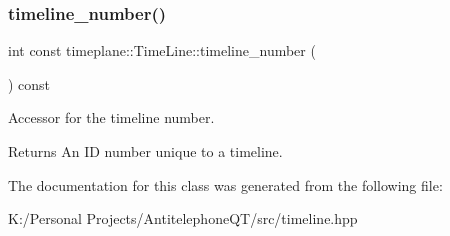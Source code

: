 \subsubsection{\texorpdfstring{timeline\+\_\+number()}{timeline\_number()}}
{\footnotesize\ttfamily int const timeplane\+::\+Time\+Line\+::timeline\+\_\+number (\begin{DoxyParamCaption}{ }\end{DoxyParamCaption}) const\hspace{0.3cm}{\ttfamily [noexcept]}}



Accessor for the timeline number. 

\begin{DoxyReturn}{Returns}
An ID number unique to a timeline. 
\end{DoxyReturn}


The documentation for this class was generated from the following file\+:\begin{DoxyCompactItemize}
\item 
K\+:/\+Personal Projects/\+Antitelephone\+Q\+T/src/timeline.\+hpp\end{DoxyCompactItemize}
